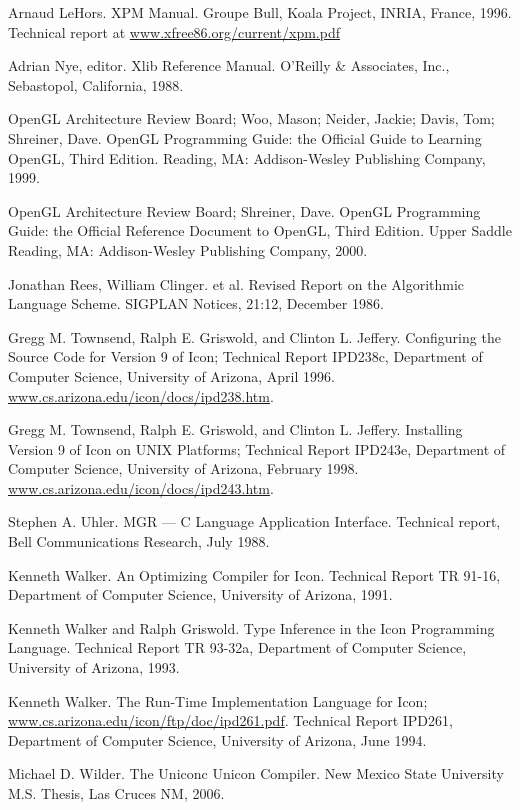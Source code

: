 \begin{noIndex}
\noindent
[LeHors96] Arnaud LeHors. XPM Manual. Groupe Bull, Koala
Project, INRIA, France, 1996. Technical report at
\url{www.xfree86.org/current/xpm.pdf}

\noindent
[Nye88] Adrian Nye, editor. Xlib Reference Manual. O'Reilly \&
Associates, Inc., Sebastopol, California, 1988.

\noindent
[OpenGL99] OpenGL Architecture Review Board; Woo, Mason; Neider,
Jackie; Davis, Tom; Shreiner, Dave. OpenGL Programming Guide: the
Official Guide to Learning OpenGL, Third Edition. Reading, MA:
Addison-Wesley Publishing Company, 1999.

\noindent
[OpenGL00] OpenGL Architecture Review Board; Shreiner, Dave. OpenGL
Programming Guide: the Official Reference Document to OpenGL, Third
Edition. Upper Saddle Reading, MA: Addison-Wesley Publishing Company,
2000.

\noindent
[Rees 86] Jonathan Rees, William Clinger. et al. Revised Report on the
Algorithmic Language Scheme. SIGPLAN Notices, 21:12, December 1986.

\noindent
[TGJ96] Gregg M. Townsend, Ralph E. Griswold, and Clinton
L. Jeffery. Configuring the Source Code for Version 9 of Icon;
Technical Report IPD238c, Department of Computer Science, University
of Arizona, April 1996.
\url{www.cs.arizona.edu/icon/docs/ipd238.htm}.

\noindent
[TGJ98] Gregg M. Townsend, Ralph E. Griswold, and Clinton
L. Jeffery. Installing Version 9 of Icon on UNIX Platforms; Technical
Report IPD243e, Department of Computer Science, University of Arizona,
February 1998.
\url{www.cs.arizona.edu/icon/docs/ipd243.htm}.

\noindent
[Uhl88] Stephen A. Uhler. MGR --- C Language Application
Interface. Technical report, Bell Communications Research, July 1988.

\noindent
[Walker91] Kenneth Walker. An Optimizing Compiler for Icon.
Technical Report TR 91-16, Department of Computer Science,
University of Arizona, 1991.

\noindent
[Walker93] Kenneth Walker and Ralph Griswold. Type Inference in the
Icon Programming Language. Technical Report TR 93-32a, Department
of Computer Science, University of Arizona, 1993.

\noindent
[Walker94] Kenneth Walker. The Run-Time Implementation Language for Icon;
\url{www.cs.arizona.edu/icon/ftp/doc/ipd261.pdf}. Technical
Report IPD261, Department of Computer Science, University of Arizona,
June 1994.

\noindent
[Wilder06] Michael D. Wilder. The Uniconc Unicon Compiler.
New Mexico State University M.S. Thesis, Las Cruces NM, 2006.


\end{noIndex}

